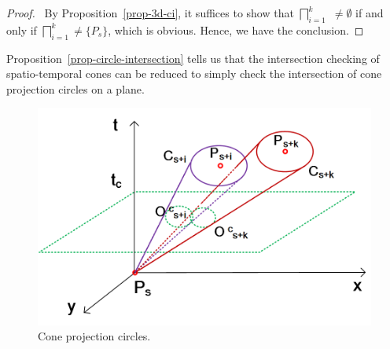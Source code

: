 \begin{proof}\
By Proposition~\ref{prop-3d-ci}, it suffices to show that $\bigsqcap_{i=1}^{k}$  $\ne \emptyset$ if and only if $\bigsqcap_{i=1}^{k}$$\ne \{P_s\}$, which is obvious. Hence, we have the conclusion. \eop
\end{proof}



Proposition~\ref{prop-circle-intersection} tells us that the intersection checking of spatio-temporal cones can be reduced to simply check the intersection of cone projection circles on a plane. %

\begin{figure}[tb!]
	\centering
	\includegraphics[scale=0.7]{figures/Fig-project-circle.png}
	\caption{\small Cone projection circles.}
	\vspace{-1ex}
	\label{fig:pcircle}
\end{figure}


